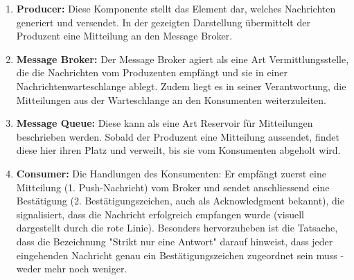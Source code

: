 \begin{enumerate}
\item \textbf{Producer:} Diese Komponente stellt das Element dar, welches Nachrichten generiert und versendet. In der gezeigten Darstellung übermittelt der Produzent eine Mitteilung an den Message Broker.
\item \textbf{Message Broker:} Der Message Broker agiert als eine Art Vermittlungsstelle, die die Nachrichten vom Produzenten empfängt und sie in einer Nachrichtenwarteschlange ablegt. Zudem liegt es in seiner Verantwortung, die Mitteilungen aus der Warteschlange an den Konsumenten weiterzuleiten.
\item \textbf{Message Queue:} Diese kann als eine Art Reservoir für Mitteilungen beschrieben werden. Sobald der Produzent eine Mitteilung aussendet, findet diese hier ihren Platz und verweilt, bis sie vom Konsumenten abgeholt wird.
\item \textbf{Consumer:} Die Handlungen des Konsumenten: Er empfängt zuerst eine Mitteilung (1. Push-Nachricht) vom Broker und sendet anschliessend eine Bestätigung (2. Bestätigungszeichen, auch als Acknowledgment bekannt), die signalisiert, dass die Nachricht erfolgreich empfangen wurde (visuell dargestellt durch die rote Linie). Besonders hervorzuheben ist die Tatsache, dass die Bezeichnung "Strikt nur eine Antwort" darauf hinweist, dass jeder eingehenden Nachricht genau ein Bestätigungszeichen zugeordnet sein muss - weder mehr noch weniger.
\end{enumerate}